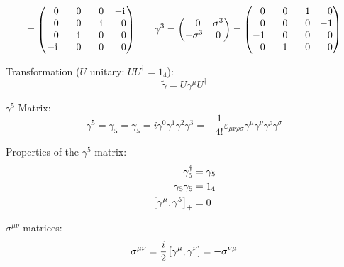 \begin{equation}
\begin{aligned}
					= \left( \begin{matrix}
					\M 0 & \M 0 & \M 0 &  -\i \\
					\M 0 & \M 0 & \M\i & \M 0 \\
					\M 0 & \M\i & \M 0 & \M 0 \\
					-\i & \M 0 & \M 0 & \M 0 \\
					\end{matrix} \right)
					&\hspace{20pt}
					\gamma^3
					= \left( \begin{matrix}
					\M 0 & \sigma^3 \\
					-\sigma^3 &  0
					\end{matrix} \right)
					= \left( \begin{matrix}
					\M 0 & \M 0 & \M 1 & \M 0 \\
					\M 0 & \M 0 & \M 0 &   -1 \\
					-1 & \M 0 & \M 0 & \M 0 \\
					\M 0 & \M 1 & \M 0 & \M 0 \\
					\end{matrix} \right) \\
				\end{aligned}
			\end{equation}

			\noindent
			Transformation ($U$ unitary: $U U^\dagger=1_4$):
			\begin{equation}
				\tilde{\gamma} = U \gamma^\mu U^\dagger
			\end{equation}

			\noindent
			$\gamma^5$-Matrix:
			\begin{equation}
				\gamma^5 = \gamma_5 = \gamma_5 = i\gamma^0 \gamma^1 \gamma^2 \gamma^3 = -\frac{1}{4!}\varepsilon_{\mu\nu\rho\sigma} \gamma^\mu \gamma^\nu \gamma^\rho \gamma^\sigma
			\end{equation}

			\noindent
			Properties of the $\gamma^5$-matrix:
			\begin{equation}
				\begin{aligned}
					\gamma_5^\dagger &= \gamma_5 \\
					\gamma_5 \gamma_5 &= 1_4 \\
					\left[\gamma^\mu,\gamma^5\right]_{+} &= 0 \\
				\end{aligned}
			\end{equation}

			\noindent
			$\sigma^{\mu\nu}$ matrices:
			\begin{equation}
				\sigma^{\mu\nu} = \frac{i}{2}\left[\gamma^\mu,\gamma^\nu\right] = -\sigma^{\nu\mu}
			\end{equation}


